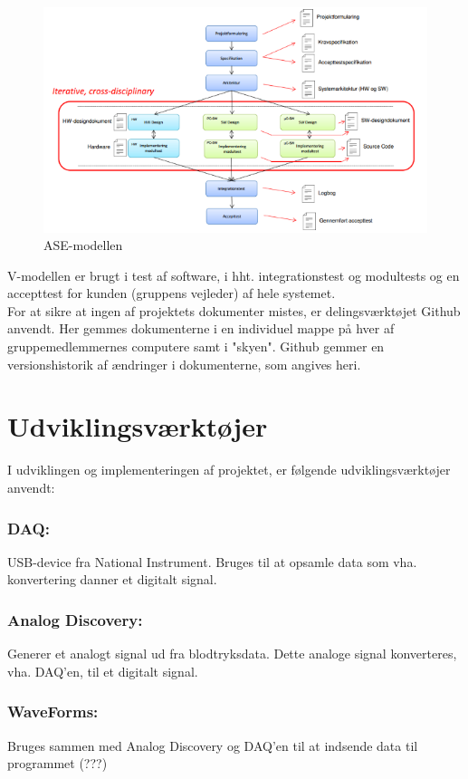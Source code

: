 \begin{figure}[H]
\centering
\includegraphics[scale=0.80]{ase.PNG}
\caption{ASE-modellen}
\end{figure}

V-modellen er brugt i test af software, i hht. integrationstest og modultests og en accepttest for kunden (gruppens vejleder) af hele systemet. \\
\newline
For at sikre at ingen af projektets dokumenter mistes, er delingsværktøjet Github anvendt. Her gemmes dokumenterne i en individuel mappe på hver af gruppemedlemmernes computere samt i "skyen". Github gemmer en versionshistorik af ændringer i dokumenterne, som angives heri.  

\section{Udviklingsværktøjer} %
I udviklingen og implementeringen af projektet, er følgende udviklingsværktøjer anvendt:
\subsubsection{DAQ:}
USB-device fra National Instrument. Bruges til at opsamle data som vha. konvertering danner et digitalt signal.
\subsubsection{Analog Discovery:}
Generer et analogt signal ud fra blodtryksdata. Dette analoge signal konverteres, vha. DAQ'en, til et digitalt signal.
\subsubsection{WaveForms:}
Bruges sammen med Analog Discovery og DAQ'en til at indsende data til programmet (???)
